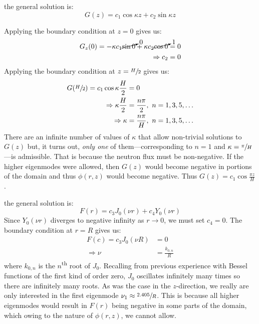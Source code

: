  the general solution is:
\begin{equation*}
G(z) = c_1\cos{\kappa z} + c_2 \sin{\kappa z}
\end{equation*}

Applying the boundary condition at $z=0$ gives us:
\begin{align*}
G_z(0) = -\kappa c_1 \cancelto{0}{\sin{0}} + \kappa c_2 \cancelto{1}{\cos{0}} &= 0 \\
\Rightarrow c_2 &= 0 
\end{align*}
Applying the boundary condition at $z=\sfrac{H}{2}$ gives us:
\begin{align*}
G(\sfrac{H}{2}) = c_1 \cos{\kappa \frac{H}{2}} &= 0 \\
\Rightarrow \kappa \frac{H}{2} &= \frac{n\pi}{2}, \ n=1,3,5,\dots \\
\Rightarrow \kappa &= \frac{n \pi}{H}, \ n=1,3,5,\dots
\end{align*}
There are an infinite number of values of $\kappa$ that allow non-trivial solutions to $G(z)$ but, it turns out, \emph{only one} of them---corresponding to $n=1$ and $\kappa = \sfrac{\pi}{H}$---is admissible.  That is because the neutron flux must be non-negative.  If the higher eigenmodes were allowed, then $G(z)$ would become negative in portions of the domain and thus $\phi(r,z)$ would become negative. Thus $G(z) = c_1\cos{\frac{\pi z}{H}}$.  

 the general solution is:
\begin{equation*}
F(r) = c_3J_0(\nu r) + c_4Y_0(\nu r)
\end{equation*}
Since $Y_0(\nu r)$ diverges to negative infinity as $r \to 0$, we must set $c_4 = 0$. The boundary condition at $r=R$ gives us:
\begin{align*}
F(c) = c_3 J_0(\nu R) &= 0 \\
\Rightarrow \nu &= \frac{k_{0,n}}{R}
\end{align*}
where $k_{0,n}$ is the $n$\textsuperscript{th} root of $J_0$.  Recalling from previous experience with Bessel functions of the first kind of order zero, $J_0$ oscillates infinitely many times so there are infinitely many roots.  As was the case in the $z$-direction, we really are only interested in the first eigenmode $\nu_1 \approx \sfrac{2.405}{R}$.  This is because all higher eigenmodes would result in $F(r)$ being negative in some parts of the domain, which owing to the nature of $\phi(r,z)$, we cannot allow.

